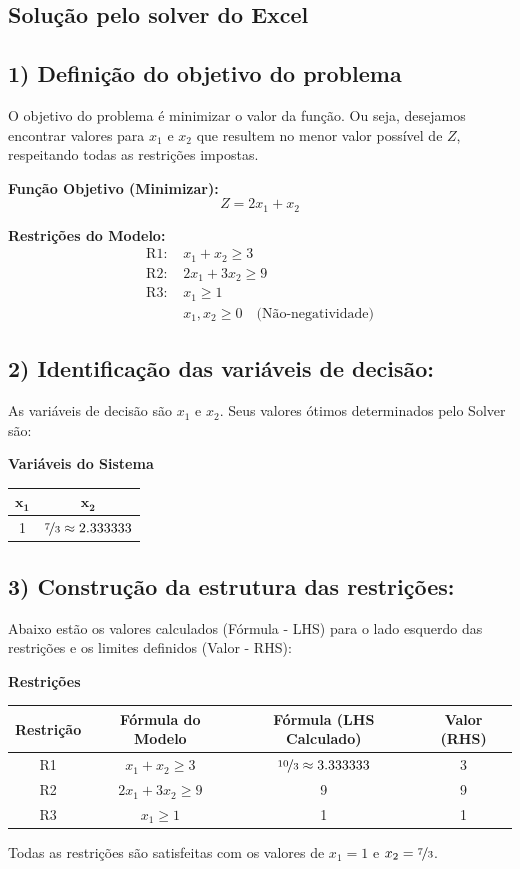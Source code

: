 \documentclass[12pt, a4paper]{article}
\begin{document}
\subsection[Solver]{Solução pelo solver do Excel}
\subsection*{1) Definição do objetivo do problema}
O objetivo do problema é minimizar o valor da função. Ou seja, desejamos encontrar valores para $x_1$ e $x_2$ que resultem no menor valor possível de $Z$, respeitando todas as restrições impostas.

\textbf{Função Objetivo (Minimizar):}
$$Z = 2x_1 + x_2$$

\textbf{Restrições do Modelo:}
\begin{align*}
\text{R1: } & x_1 + x_2 \geq 3 \\
\text{R2: } & 2x_1 + 3x_2 \geq 9 \\
\text{R3: } & x_1 \geq 1 \\
& x_1, x_2 \geq 0 \quad \text{(Não-negatividade)}
\end{align*}

\subsection*{2) Identificação das variáveis de decisão:}
As variáveis de decisão são $x_1$ e $x_2$. Seus valores ótimos determinados pelo Solver são:

\textbf{Variáveis do Sistema}
\begin{center}
\begin{tabular}{|c|c|}
\hline
$\mathbf{x_1}$ & $\mathbf{x_2}$ \\
\hline
1 & $\nicefrac{7}{3} \approx 2.333333$ \\
\hline
\end{tabular}
\end{center}

\subsection*{3) Construção da estrutura das restrições:}
Abaixo estão os valores calculados (Fórmula - LHS) para o lado esquerdo das restrições e os limites definidos (Valor - RHS):

\textbf{Restrições}
\begin{center}
\begin{tabular}{|c|c|c|c|}
\hline
\textbf{Restrição} & \textbf{Fórmula do Modelo} & \textbf{Fórmula (LHS Calculado)} & \textbf{Valor (RHS)} \\
\hline
R1 & $x_1 + x_2 \geq 3$ & $\nicefrac{10}{3} \approx 3.333333$ & 3 \\
\hline
R2 & $2x_1 + 3x_2 \geq 9$ & 9 & 9 \\
\hline
R3 & $x_1 \geq 1$ & 1 & 1 \\
\hline
\end{tabular}
\end{center}
Todas as restrições são satisfeitas com os valores de $x_1=1$ e $x_2=\nicefrac{7}{3}$.
\end{document}
